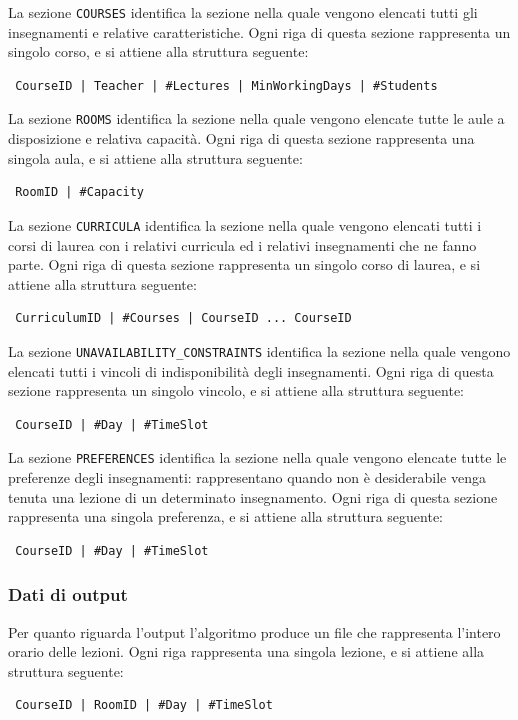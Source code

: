 \documentclass[11pt,a4paper]{article}
\begin{document}
La sezione \verb|COURSES| identifica la sezione nella quale vengono elencati tutti gli insegnamenti e relative caratteristiche. Ogni riga di questa sezione rappresenta un singolo corso, e si attiene alla struttura seguente: \begin{verbatim}
 CourseID | Teacher | #Lectures | MinWorkingDays | #Students
\end{verbatim}

La sezione \verb|ROOMS| identifica la sezione nella quale vengono elencate tutte le aule a disposizione e relativa capacità. Ogni riga di questa sezione rappresenta una singola aula, e si attiene alla  struttura seguente:
\begin{verbatim}
 RoomID | #Capacity
\end{verbatim}

La sezione \verb|CURRICULA| identifica la sezione nella quale vengono elencati tutti i corsi di laurea con i relativi curricula ed i relativi insegnamenti che ne fanno parte. Ogni riga di questa sezione rappresenta un singolo corso di laurea, e si attiene alla struttura seguente:
\begin{verbatim}
 CurriculumID | #Courses | CourseID ... CourseID
\end{verbatim}

La sezione \verb|UNAVAILABILITY_CONSTRAINTS| identifica la sezione nella quale vengono elencati tutti i vincoli di indisponibilità degli insegnamenti. Ogni riga di questa sezione rappresenta un singolo vincolo, e si attiene alla struttura seguente:
\begin{verbatim}
 CourseID | #Day | #TimeSlot
\end{verbatim}


La sezione \verb|PREFERENCES| identifica la sezione nella quale vengono elencate tutte le preferenze degli insegnamenti: rappresentano quando non è desiderabile venga tenuta una lezione di un determinato insegnamento. Ogni riga di questa sezione rappresenta una singola preferenza, e si attiene alla struttura seguente:
\begin{verbatim}
 CourseID | #Day | #TimeSlot
\end{verbatim}

\subsubsection*{Dati di output}
Per quanto riguarda l'output l'algoritmo produce un file che rappresenta l'intero orario delle lezioni. Ogni riga rappresenta una singola lezione, e si attiene alla struttura seguente:
\begin{verbatim}
 CourseID | RoomID | #Day | #TimeSlot
\end{verbatim}
\end{document}

